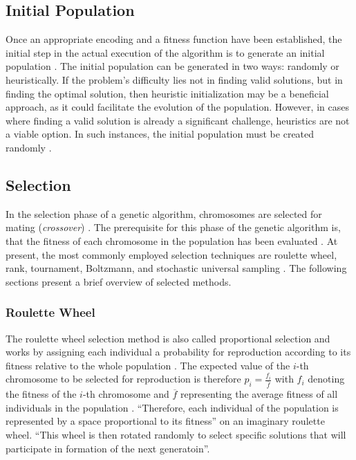 \documentclass[sigconf]{acmart}
\begin{document}
\subsection{Initial Population}
Once an appropriate encoding and a fitness function have been established,
the initial step in the actual execution of the algorithm is to generate an
initial population \cite{Affenzeller2009}.
The initial population can be generated in two ways: randomly or heuristically.
If the problem's difficulty lies not in finding valid solutions, but in finding
the optimal solution, then heuristic initialization may be a beneficial
approach, as it could facilitate the evolution of the population.
However, in cases where finding a valid solution is already a significant
challenge, heuristics are not a viable option. In such instances, the initial
population must be created randomly \cite{Affenzeller2009}.

\subsection{Selection}
In the selection phase of a genetic algorithm, chromosomes are selected for
mating (\textit{crossover}) \cite{Affenzeller2009}.
The prerequisite for this phase of the genetic algorithm is, that the
fitness of each chromosome in the population has been evaluated
\cite{Affenzeller2009}.
At present, the most commonly employed selection techniques are roulette wheel,
rank, tournament, Boltzmann, and stochastic universal sampling
\cite{Katoch2021}.
The following sections present a brief overview of selected methods.

\subsubsection{Roulette Wheel}
The roulette wheel selection method is also called proportional selection
and works by assigning each individual a probability for reproduction according
to its fitness relative to the whole population \cite{Affenzeller2009}.
The expected value of the $i$-th chromosome to be selected for reproduction
is therefore $p_i = \frac{f_i}{\overline{f}}$ with $f_i$ denoting the fitness
of the $i$-th chromosome and $\overline{f}$ representing the average fitness
of all individuals in the population \cite{Affenzeller2009}.
\enquote{Therefore, each individual of the population is represented by a
space proportional to its fitness}\cite{Affenzeller2009} on an imaginary
roulette wheel.
\enquote{This wheel is then rotated randomly to select specific solutions that
will participate in formation of the next generatoin}\cite{Katoch2021}.
\end{document}
